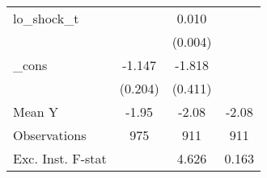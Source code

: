 {\begin{tabular}{l*{3}{c}}
\addlinespace
lo\_shock\_t  &                     &       0.010\sym{**} &                     \\
            &                     &     (0.004)         &                     \\
\addlinespace
\_cons      &      -1.147\sym{***}&      -1.818\sym{***}&                     \\
            &     (0.204)         &     (0.411)         &                     \\
\midrule
Mean Y      &       -1.95         &       -2.08         &       -2.08         \\
Observations&         975         &         911         &         911         \\
Exc. Inst. F-stat&                     &       4.626         &       0.163         \\
\bottomrule
\end{tabular}
}
